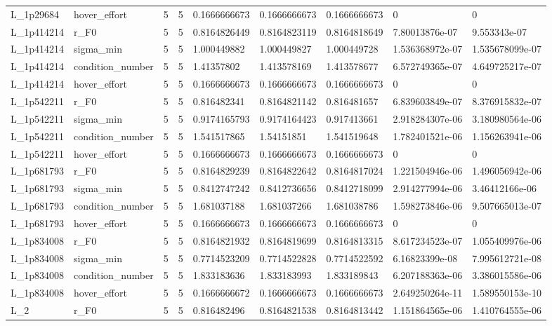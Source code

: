 \begin{tabular}{@{}lllllllll@{}}
L\_1p29684 & hover\_effort & 5 & 5 & 0.1666666673 & 0.1666666673 & 0.1666666673 & 0 & 0 \\
L\_1p414214 & r\_F0 & 5 & 5 & 0.8164826449 & 0.8164823119 & 0.8164818649 & 7.80013876e-07 & 9.553343e-07 \\
L\_1p414214 & sigma\_min & 5 & 5 & 1.000449882 & 1.000449827 & 1.000449728 & 1.536368972e-07 & 1.535678099e-07 \\
L\_1p414214 & condition\_number & 5 & 5 & 1.41357802 & 1.413578169 & 1.413578677 & 6.572749365e-07 & 4.649725217e-07 \\
L\_1p414214 & hover\_effort & 5 & 5 & 0.1666666673 & 0.1666666673 & 0.1666666673 & 0 & 0 \\
L\_1p542211 & r\_F0 & 5 & 5 & 0.816482341 & 0.8164821142 & 0.816481657 & 6.839603849e-07 & 8.376915832e-07 \\
L\_1p542211 & sigma\_min & 5 & 5 & 0.9174165793 & 0.9174164423 & 0.917413661 & 2.918284307e-06 & 3.180980564e-06 \\
L\_1p542211 & condition\_number & 5 & 5 & 1.541517865 & 1.54151851 & 1.541519648 & 1.782401521e-06 & 1.156263941e-06 \\
L\_1p542211 & hover\_effort & 5 & 5 & 0.1666666673 & 0.1666666673 & 0.1666666673 & 0 & 0 \\
L\_1p681793 & r\_F0 & 5 & 5 & 0.8164829239 & 0.8164822642 & 0.8164817024 & 1.221504946e-06 & 1.496056942e-06 \\
L\_1p681793 & sigma\_min & 5 & 5 & 0.8412747242 & 0.8412736656 & 0.8412718099 & 2.914277994e-06 & 3.46412166e-06 \\
L\_1p681793 & condition\_number & 5 & 5 & 1.681037188 & 1.681037266 & 1.681038786 & 1.598273846e-06 & 9.507665013e-07 \\
L\_1p681793 & hover\_effort & 5 & 5 & 0.1666666673 & 0.1666666673 & 0.1666666673 & 0 & 0 \\
L\_1p834008 & r\_F0 & 5 & 5 & 0.8164821932 & 0.8164819699 & 0.8164813315 & 8.617234523e-07 & 1.055409976e-06 \\
L\_1p834008 & sigma\_min & 5 & 5 & 0.7714523209 & 0.7714522828 & 0.7714522592 & 6.16823399e-08 & 7.995612721e-08 \\
L\_1p834008 & condition\_number & 5 & 5 & 1.833183636 & 1.833183993 & 1.833189843 & 6.207188363e-06 & 3.386015586e-06 \\
L\_1p834008 & hover\_effort & 5 & 5 & 0.1666666672 & 0.1666666673 & 0.1666666673 & 2.649250264e-11 & 1.589550153e-10 \\
L\_2 & r\_F0 & 5 & 5 & 0.816482496 & 0.8164821538 & 0.8164813442 & 1.151864565e-06 & 1.410764555e-06 \\

\end{tabular}
